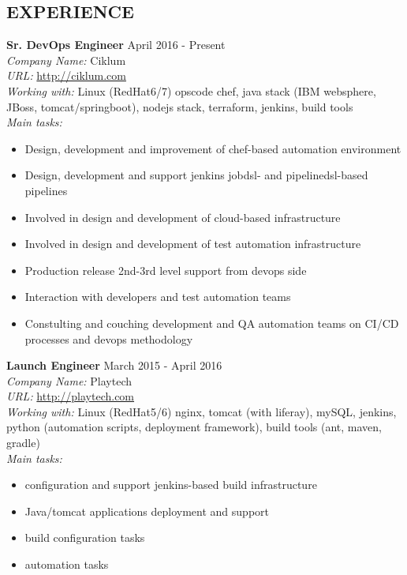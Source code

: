 \documentclass[mymargin,10pt]{res} %
\begin{document}
\begin{resume}

\section{EXPERIENCE}

{\bf Sr. DevOps Engineer} \hfill April 2016 - Present \\
{\sl Company Name:} Ciklum \\
{\sl URL:} \url{http://ciklum.com} \\
{\sl Working with:} Linux (RedHat6/7) opscode chef, java stack (IBM websphere, JBoss, tomcat/springboot), nodejs stack, terraform, jenkins, build tools \\
{\sl Main tasks:}
\begin{itemize}
\item Design, development and improvement of chef-based automation environment
\item Design, development and support jenkins jobdsl- and pipelinedsl-based pipelines
\item Involved in design and development of cloud-based infrastructure
\item Involved in design and development of test automation infrastructure
\item Production release 2nd-3rd level support from devops side
\item Interaction with developers and test automation teams
\item Constulting and couching development and QA automation teams on CI/CD processes and devops methodology
\end{itemize}

{\bf Launch Engineer} \hfill March 2015 - April 2016 \\
{\sl Company Name:} Playtech \\
{\sl URL:} \url{http://playtech.com} \\
{\sl Working with:} Linux (RedHat5/6) nginx, tomcat (with liferay), mySQL, jenkins, python (automation scripts, deployment framework), build tools (ant, maven, gradle) \\
{\sl Main tasks:}
\begin{itemize}
\item configuration and support jenkins-based build infrastructure
\item Java/tomcat applications deployment and support
\item build configuration tasks
\item automation tasks
\end{itemize}


\end{resume}
\end{document}
